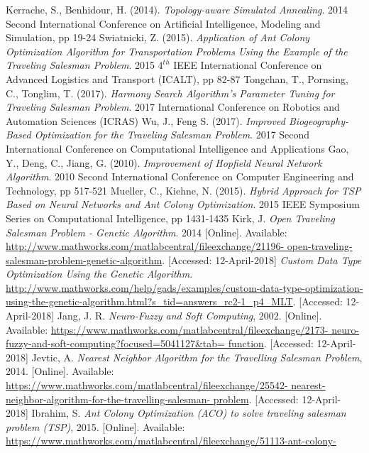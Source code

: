 \documentclass[twocolumn]{article}
\begin{document}
\begin{thebibliography}{999}
		Kerrache, S., Benhidour, H. (2014).
		\emph{Topology-aware Simulated Annealing}.
		2014 Second International Conference on Artificial Intelligence, Modeling and Simulation,
		pp 19-24
		Swiatnicki, Z. (2015).
		\emph{Application of Ant Colony Optimization Algorithm for Transportation Problems Using the Example of the Traveling Salesman Problem}.
		2015 $4^{th}$ IEEE International Conference on Advanced Logistics and Transport (ICALT),
		pp 82-87
		Tongchan, T., Pornsing, C., Tonglim, T. (2017).
		\emph{Harmony Search Algorithm's Parameter Tuning for Traveling Salesman Problem}.
		2017 International Conference on Robotics and Automation Sciences (ICRAS)
		Wu, J., Feng S. (2017).
		\emph{Improved Biogeography-Based Optimization for the Traveling Salesman Problem}.
		2017 Second International Conference on Computational Intelligence and Applications
		Gao, Y., Deng, C., Jiang, G. (2010).
		\emph{Improvement of Hopfield Neural Network Algorithm}.
		2010 Second International Conference on Computer Engineering and Technology,
		pp 517-521
		Mueller, C., Kiehne, N. (2015).
		\emph{Hybrid Approach for TSP Based on Neural Networks and Ant Colony Optimization}.
		2015 IEEE Symposium Series on Computational Intelligence,
		pp 1431-1435
		Kirk, J.
		\emph{Open Traveling Salesman Problem - Genetic Algorithm}. 2014 [Online].
		Available: \url{http://www.mathworks.com/matlabcentral/fileexchange/21196-
			open-traveling-salesman-problem-genetic-algorithm}. [Accessed: 12-April-2018]
		\emph{Custom Data Type Optimization Using the Genetic Algorithm}.
		\url{http://www.mathworks.com/help/gads/examples/custom-data-type-optimization-using-the-genetic-algorithm.html?s_tid=answers_rc2-1_p4_MLT}. [Accessed: 12-April-2018]
		Jang, J. R.
		\emph{Neuro-Fuzzy and Soft Computing}, 2002. [Online].
		Available: \url{https://www.mathworks.com/matlabcentral/fileexchange/2173-
			neuro-fuzzy-and-soft-computing?focused=5041127&tab=
			function}. [Accessed: 12-April-2018]
		Jevtic, A.
		\emph{Nearest Neighbor Algorithm for the Travelling Salesman Problem}, 2014. [Online]. Available: \url{https://www.mathworks.com/matlabcentral/fileexchange/25542-
			nearest-neighbor-algorithm-for-the-travelling-salesman-
			problem}. [Accessed: 12-April-2018]
		Ibrahim, S.
		\emph{Ant Colony Optimization (ACO) to solve traveling salesman problem (TSP)}, 2015. [Online]. Available: \url{https://www.mathworks.com/matlabcentral/fileexchange/51113-ant-colony-
}
\end{thebibliography}
\end{document}
